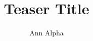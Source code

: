 \documentclass{article}
\usepackage{caption}
\makeatletter
\g@addto@macro{}
\makeatother

\title{Teaser Title}
\author{Ann Alpha}
\maketitle
\begin{abstract}
Abstract text.
\end{abstract}
\section{Introduction}
See Figure~\ref{fig:teaser}.

